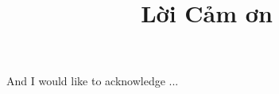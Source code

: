 
\begin{acknowledgements}
\title{Lời Cảm ơn}      


And I would like to acknowledge ...


\end{acknowledgements}
